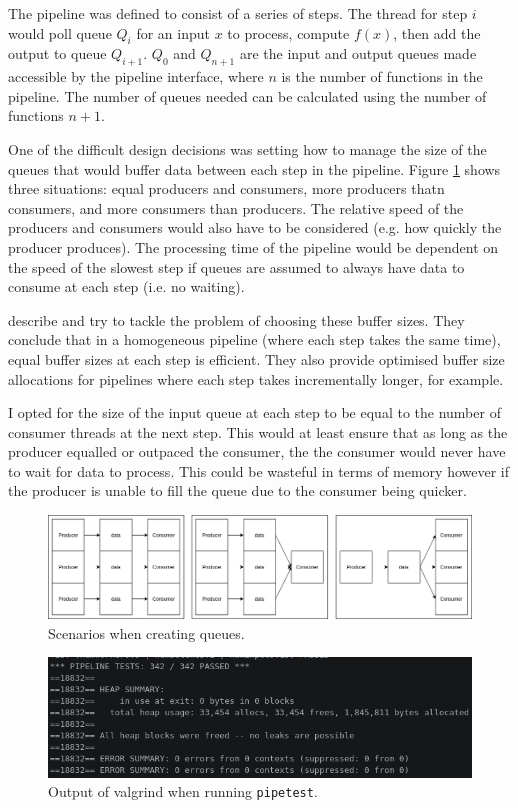 \documentclass[12pt]{article}
\def\code#1{\texttt{#1}}
\begin{document}
The pipeline was defined to consist of a series of steps. The thread for step $i$ would poll queue $Q_i$ for an input $x$ to process, compute $f(x)$, then add the output to queue $Q_{i+1}$. $Q_0$ and $Q_{n+1}$ are the input and output queues made accessible by the pipeline interface, where $n$ is the number of functions in the pipeline. The number of queues needed can be calculated using the number of functions $n+1$. 

One of the difficult design decisions was setting how to manage the size of the queues that would buffer data between each step in the pipeline. Figure \ref{fig:qsize} shows three situations: equal producers and consumers, more producers thatn consumers, and more consumers than producers. The relative speed of the producers and consumers would also have to be considered (e.g. how quickly the producer produces). The processing time of the pipeline would be dependent on the speed of the slowest step if queues are assumed to always have data to consume at each step (i.e. no waiting).

\cite{buffer} describe and try to tackle the problem of choosing these buffer sizes. They conclude that in a homogeneous pipeline (where each step takes the same time), equal buffer sizes at each step is efficient. They also provide optimised buffer size allocations for pipelines where each step takes incrementally longer, for example. 

I opted for the size of the input queue at each step to be equal to the number of consumer threads at the next step. This would at least ensure that as long as the producer equalled or outpaced the consumer, the the consumer would never have to wait for data to process. This could be wasteful in terms of memory however if the producer is unable to fill the queue due to the consumer being quicker.

\begin{figure}[!ht]
	\centering 
	\includegraphics[width=\linewidth]{images/qsize}
	\caption{Scenarios when creating queues.}
	\label{fig:qsize}
\end{figure}

\begin{figure}[!ht]
	\centering 
	\includegraphics[width=0.8\linewidth]{images/pipetest}
	\caption{Output of valgrind when running \code{pipetest}.}
	\label{fig:pipetest}
\end{figure}
\end{document}
